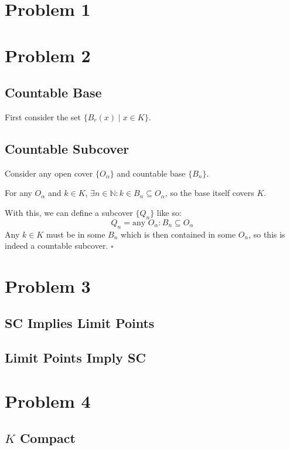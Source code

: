 \documentclass[12pt]{article}
\newcommand{\N}{\mathbb{N}}
\begin{document}
\section{Problem 1}

\section{Problem 2}

\subsection{Countable Base}

First consider the set $\{B_r(x) \mid x \in K\}$.

\subsection{Countable Subcover}

Consider any open cover $\{O_\alpha\}$ and countable base $\{B_n\}$.

For any $O_\alpha$ and $k \in K$, $\exists n \in \N: k \in B_n \subseteq O_\alpha$,
so the base itself covers $K$.

With this, we can define a subcover $\{Q_n\}$ like so:
\[Q_n = \text{any } O_\alpha: B_n \subseteq O_\alpha\]
Any $k \in K$ must be in some $B_n$ which is then contained in some $O_n$,
so this is indeed a countable subcover. $\square$

\section{Problem 3}

\subsection{SC Implies Limit Points}

\subsection{Limit Points Imply SC}

\pagebreak

\section{Problem 4}

\subsection{\texorpdfstring{$K$}{K} Compact}
\end{document}
